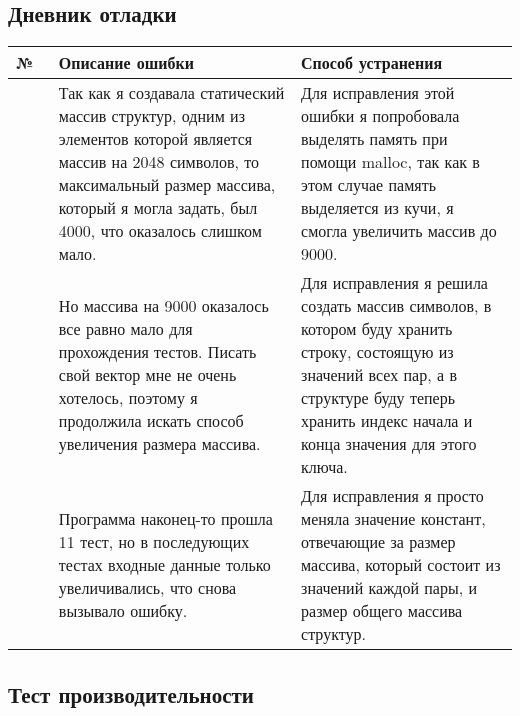 \documentclass[12pt]{article}
\newcounter{ROWNUMBERTABLE}
\newcommand\rownumber{\stepcounter{ROWNUMBERTABLE}\arabic{ROWNUMBERTABLE}}
\begin{document}
\subsection*{Дневник отладки}

\begin{center}
\begin{tabular}{|p{0.3cm}|p{6cm} |p{6.7cm}|}
\hline
№\ & Описание ошибки &  Способ устранения \\
\hline
\rownumber & Так как я создавала статический массив структур, одним из элементов которой является массив на 2048 символов, то максимальный размер массива, который я могла задать, был 4000, что оказалось слишком мало.  & Для исправления этой ошибки я попробовала выделять память при помощи malloc, так как в этом случае память выделяется из кучи, я смогла увеличить массив до 9000. \\
\hline
\rownumber & Но массива на 9000 оказалось все равно мало для прохождения тестов. Писать свой вектор мне не очень хотелось, поэтому я продолжила искать способ увеличения размера массива.  & Для исправления я решила создать массив символов, в котором буду хранить строку, состоящую из значений всех пар, а в структуре буду теперь хранить индекс начала и конца значения для этого ключа. \\
\hline
\rownumber & Программа наконец-то прошла 11 тест, но в последующих тестах входные данные только увеличивались, что снова вызывало ошибку.  & Для исправления я просто меняла значение констант, отвечающие за размер массива, который состоит из значений каждой пары, и размер общего массива структур. \\
\hline
\end{tabular}
\setcounter{ROWNUMBERTABLE}{0}
\end{center}


\subsection*{Тест производительности}
\end{document}
